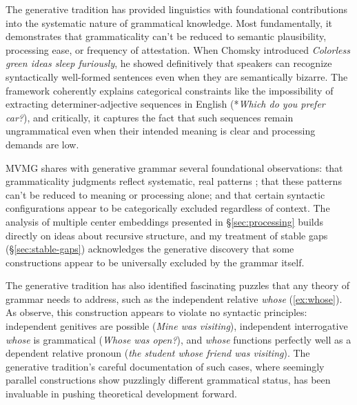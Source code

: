 \documentclass[12pt,letterpaper]{article}
\newcommand{\mention}[1]{\textit{#1}}
\begin{document}
The generative tradition has provided linguistics with foundational contributions into the systematic nature of grammatical knowledge. Most fundamentally, it demonstrates that grammaticality can't be reduced to semantic plausibility, processing ease, or frequency of attestation. When Chomsky introduced \textit{Colorless green ideas sleep furiously}, he showed definitively that speakers can recognize syntactically well-formed sentences even when they are semantically bizarre. The framework coherently explains categorical constraints like the impossibility of extracting determiner-adjective sequences in English (*\textit{Which do you prefer car?}), and critically, it captures the fact that such sequences remain ungrammatical even when their intended meaning is clear and processing demands are low. 

MVMG shares with generative grammar several foundational observations: that grammaticality judgments reflect systematic, real patterns \autocite{dennett1991}; that these patterns can't be reduced to meaning or processing alone; and that certain syntactic configurations appear to be categorically excluded regardless of context. The analysis of multiple center embeddings presented in \S\ref{sec:processing} builds directly on ideas about recursive structure, and my treatment of stable gaps (\S\ref{sec:stable-gaps}) acknowledges the generative discovery that some constructions appear to be universally excluded by the grammar itself.

The generative tradition has also identified fascinating puzzles that any theory of grammar needs to address, such as the independent relative \mention{whose} (\ref{ex:whose}). As \textcite{hankamer1973whose} observe, this construction appears to violate no syntactic principles: independent genitives are possible (\textit{Mine was visiting}), independent interrogative \mention{whose} is grammatical (\textit{Whose was open?}), and \mention{whose} functions perfectly well as a dependent relative pronoun (\textit{the student whose friend was visiting}). The generative tradition's careful documentation of such cases, where seemingly parallel constructions show puzzlingly different grammatical status, has been invaluable in pushing theoretical development forward.
\end{document}
